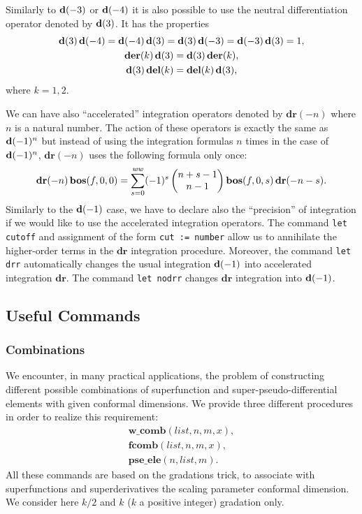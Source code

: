 {Similarly to $\mathbf{d}(-3)$ or $\mathbf{d}(-4)$ it is also possible to use the
neutral differentiation operator denoted by $\mathbf{d}(3)$.  It has the
properties
\begin{gather*}
  \mathbf{d}(3)\,\mathbf{d}(-4)=\mathbf{d}(-4)\,\mathbf{d}(3)=\mathbf{d}(3)\,\mathbf{d}(-3)=\mathbf{d}(-3)\,\mathbf{d}(3)=1, \\
  \mathbf{der}(k)\,\mathbf{d}(3)=\mathbf{d}(3)\,\mathbf{der}(k), \\
  \mathbf{d}(3)\,\mathbf{del}(k)=\mathbf{del}(k)\,\mathbf{d}(3),
\end{gather*}
where $k=1,2$.

We can have also ``accelerated'' integration operators denoted by
$\mathbf{dr}(-n)$ where $n$ is a natural number.  The action of these
operators is exactly the same as $\mathbf{d}(-1)^n$ but instead of using the
integration formulas $n$ times in the case of $\mathbf{d}(-1)^n$,
$\mathbf{dr}(-n)$ uses the following formula only once:
\begin{equation*}
  \mathbf{dr}(-n)\,\mathbf{bos}(f,0,0) = \sum^\mathit{ww}_{s=0}(-1)^{s}
  \begin{pmatrix} n+s-1 \\ n-1 \end{pmatrix}
  \mathbf{bos}(f,0,s)\,\mathbf{dr}(-n-s).
\end{equation*}
Similarly to the $\mathbf{d}(-1)$ case, we have to declare also the
``precision'' of integration if we would like to use the accelerated
integration operators.  The command \texttt{let cutoff} and assignment
of the form \texttt{cut := number} allow us to annihilate the
higher-order terms in the $\mathbf{dr}$ integration procedure.
Moreover, the command \texttt{let drr} automatically changes the usual
integration $\mathbf{d}(-1)$ into accelerated integration $\mathbf{dr}$.  The
command \texttt{let nodrr} changes $\mathbf{dr}$ integration into
$\mathbf{d}(-1)$.

\subsection{Useful Commands}

\subsubsection*{Combinations}

We encounter, in many practical applications, the problem of
constructing different possible combinations of superfunction and
super-pseudo-differential elements with given conformal dimensions.
We provide three different procedures in order to realize this
requirement:
\begin{gather*}
  \mathbf{w\_comb}(\mathit{list},n,m,x), \\
  \mathbf{fcomb}(\mathit{list},n,m,x), \\
  \mathbf{pse\_ele}(n,\mathit{list},m).
\end{gather*}
All these commands are based on the gradations trick, to associate
with superfunctions and superderivatives the scaling parameter
conformal dimension.  We consider here $k/2$ and $k$ ($k$ a positive
integer) gradation only.

}
